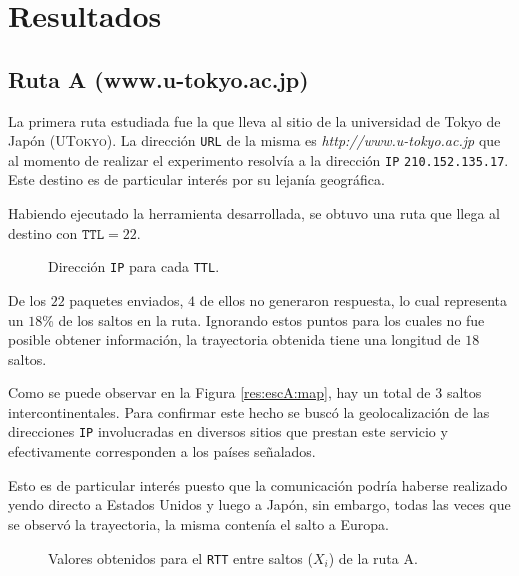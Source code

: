 \section{Resultados}

\subsection{Ruta A (www.u-tokyo.ac.jp)}

La primera ruta estudiada fue la que lleva al sitio de la
universidad de Tokyo de Japón (\textsc{UTokyo}). La dirección \texttt{URL} de la
misma es \emph{http://www.u-tokyo.ac.jp} que al momento de realizar el
experimento resolvía a la dirección \texttt{IP} \texttt{210.152.135.17}. Este
destino es de particular interés por su lejanía geográfica.

Habiendo ejecutado la herramienta desarrollada, se obtuvo una ruta que llega al
destino con $\texttt{TTL} = 22$.

\begin{figure}[H]
    \caption{Dirección \texttt{IP} para cada \texttt{TTL}.}
\end{figure}

De los $22$ paquetes enviados, $4$ de ellos no generaron
respuesta, lo cual representa un $18$\% de los saltos en la ruta. Ignorando
estos puntos para los cuales no fue posible obtener información, la trayectoria
obtenida tiene una longitud de $18$ saltos.

Como se puede observar en la Figura \ref{res:escA:map}, hay un total de 3 saltos
intercontinentales. Para confirmar este hecho se buscó la geolocalización de las
direcciones \texttt{IP} involucradas en diversos sitios que prestan este
servicio y efectivamente corresponden a los países señalados.

\begin{figure*}
    \caption{Localización de saltos según geolocalización de direcciones IP para
    el sitio \emph{www.u-tokyo.ac.jp}.}
    \label{res:escA:map}
\end{figure*}

Esto es de particular interés puesto que la comunicación podría haberse
realizado yendo directo a Estados Unidos y luego a Japón, sin embargo, todas las
veces que se observó la trayectoria, la misma contenía el salto a Europa.

\begin{figure}[H]
    \caption{Valores obtenidos para el \texttt{RTT} entre saltos ($X_i$) de la ruta A.}
    \label{res:escA:rtt}
\end{figure}

